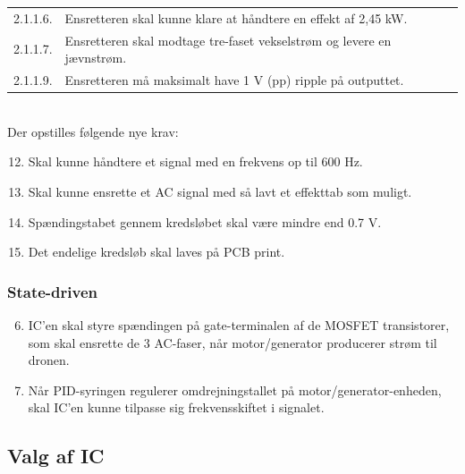 \vspace{1em}
\begin{tabular}[h]{ll}
  2.1.1.6. &Ensretteren skal kunne klare at håndtere en effekt af 2,45 kW.\vspace{0.5em}\\
  2.1.1.7. &Ensretteren skal modtage tre-faset vekselstrøm og levere en jævnstrøm.\vspace{0.5em}\\%
  2.1.1.9. &Ensretteren må maksimalt have 1 V (pp) ripple på outputtet.\vspace{0.5em}\\
\end{tabular}
\vspace{1em}\\

Der opstilles følgende nye krav:
\begin{enumerate}[label=2.1.1.\arabic*]
  \setcounter{enumi}{11}
\item Skal kunne håndtere et signal med en frekvens op til 600 Hz.
\item Skal kunne ensrette et AC signal med så lavt et effekttab som muligt.
\item Spændingstabet gennem kredsløbet skal være mindre end 0.7 V.
\item Det endelige kredsløb skal laves på PCB print.
\end{enumerate}


\subsubsection{State-driven}
\label{sec:state-driven}
\begin{enumerate}[label=2.1.3.\arabic*]
  \setcounter{enumi}{5}
\item IC’en skal styre spændingen på gate-terminalen af de MOSFET transistorer, som skal ensrette de 3 AC-faser, når motor/generator producerer strøm til dronen.
\item Når PID-syringen regulerer omdrejningstallet på motor/generator-enheden, skal IC’en kunne tilpasse sig frekvensskiftet i signalet.
\end{enumerate}



\subsection{Valg af IC }
\label{sec:valg-af-ic}

